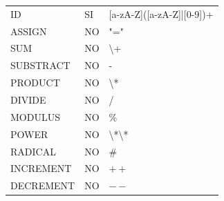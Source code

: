 \documentclass[11pt, english]{article}
\begin{document}
\begin{table}[H]
\begin{tabular}{l|l|l}
		ID                                                       & SI                                                                   & {[}a-zA-Z{]}({[}a-zA-Z{]}|{[}0-9{]})+                               \\
		ASSIGN                                                   & NO                                                                   & "="                                                                 \\
		SUM                                                      & NO                                                                   & \textbackslash{}+                                                   \\
		SUBSTRACT                                                & NO                                                                   & -                                                                   \\
		PRODUCT                                                  & NO                                                                   & \textbackslash{}*                                                   \\
		DIVIDE                                                   & NO                                                                   & /                                                                   \\
		MODULUS                                                  & NO                                                                   & \%                                                                  \\
		POWER                                                    & NO                                                                   & \textbackslash{}*\textbackslash{}*                                  \\
		RADICAL                                                  & NO                                                                   & \#                                                                  \\
		INCREMENT                                                & NO                                                                   & $++$                                                                  \\
		DECREMENT                                                & NO                                                                   & $--$                                                                  \\
		\bottomrule
	\end{tabular}
\end{table}
\end{document}
